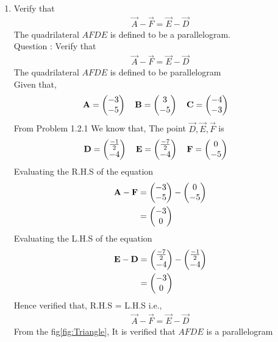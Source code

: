 \documentclass[11pt]{book}
\begin{document}
\begin{enumerate}[label=\thesection.\arabic*.,ref=\thesection.\theenumi]
\item Verify that 
		\begin{align}
\vec{A}-\vec{F}=\vec{E}-\vec{D}
		\end{align}
The quadrilateral $AFDE$ is defined to be a parallelogram.\\
Question : Verify that 
\begin{align}
	\vec{A}-\vec{F} = \vec{E}-\vec{D}
\end{align}
The quadrilateral $AFDE$ is defined to be parallelogram
\\ \solution 
Given that,
\begin{align}
    \mathbf{A} = \begin{pmatrix}-3\\-5\end{pmatrix}
    \quad
    \mathbf{B} &= \begin{pmatrix}3\\-5\end{pmatrix}
    \quad
    \mathbf{C} = \begin{pmatrix}-4\\-3\end{pmatrix}
\end{align}
From Problem 1.2.1 We know that, The point $\vec{D},\vec{E},\vec{F}$ is 
\begin{align}
    \mathbf{D} = \begin{pmatrix}\frac{-1}{2}\\ -4 \end{pmatrix}
    \quad
    \mathbf{E} &= \begin{pmatrix}\frac{-7}{2}\\-4\end{pmatrix}
    \quad
    \mathbf{F} = \begin{pmatrix}0\\ -5\end{pmatrix}
\end{align}
Evaluating the R.H.S of the equation
\begin{align}
    \mathbf{A}-\mathbf{F}&=\begin{pmatrix}-3\\-5\end{pmatrix}-\begin{pmatrix}0\\ -5 \end{pmatrix}\\
    &=\begin{pmatrix} -3 \\ 0 \end{pmatrix}
\end{align} 
Evaluating the L.H.S of the equation
\begin{align}
    \mathbf{E}-\mathbf{D}&=\begin{pmatrix}\frac{-7}{2}\\-4\end{pmatrix}-\begin{pmatrix}\frac{-1}{2}\\ -4 \end{pmatrix}\\
    &=\begin{pmatrix}-3 \\ 0 \end{pmatrix}
\end{align}
Hence verified that, R.H.S = L.H.S i.e.,
\begin{align}
	\vec{A}-\vec{F} = \vec{E}-\vec{D}
\end{align}
From the fig\ref{fig:Triangle}, It is verified that $AFDE$ is a parallelogram
\begin{figure}
\centering

\end{figure}
\end{enumerate}
\end{document}
